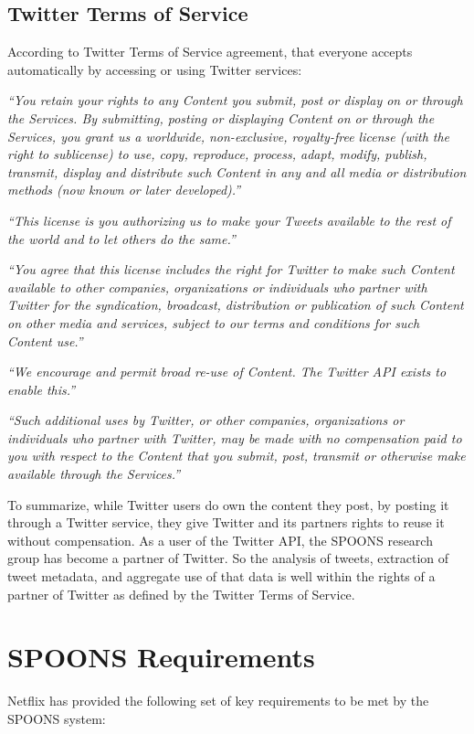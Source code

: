 \documentclass[12pt]{ucthesis}
\begin{document}
\subsection{Twitter Terms of Service}

According to Twitter Terms of Service\cite{termsOfService} agreement, that
everyone accepts automatically by accessing or using Twitter services:

\emph{``You retain your rights to any Content you submit, post or
display on or through the Services. By submitting, posting or displaying Content
on or through the Services, you grant us a worldwide, non-exclusive,
royalty-free license (with the right to sublicense) to use, copy, reproduce,
process, adapt, modify, publish, transmit, display and distribute such Content
in any and all media or distribution methods (now known or later developed).''}

\emph{``This license is you authorizing us to make your Tweets available to the
rest of the world and to let others do the same.''}

\emph{``You agree that this license includes the right for Twitter to make such
Content available to other companies, organizations or individuals who partner with
Twitter for the syndication, broadcast, distribution or publication of such
Content on other media and services, subject to our terms and conditions for
such Content use.''}

\emph{``We encourage and permit broad re-use of Content. The Twitter API exists to
enable this.''}

\emph{``Such additional uses by Twitter, or other companies, organizations or
individuals who partner with Twitter, may be made with no compensation paid to
you with respect to the Content that you submit, post, transmit or otherwise
make available through the Services.''}

To summarize, while Twitter users do own the content they post,
by posting it through a Twitter service, they give Twitter and its partners
rights to reuse it without compensation. As a user of the Twitter API, the
SPOONS research group has become a partner of Twitter. So the analysis of
tweets, extraction of tweet metadata, and aggregate use of that data is well
within the rights of a partner of Twitter as defined by the Twitter Terms of
Service.

\section{SPOONS Requirements}
Netflix has provided the following set of key requirements to be met by the
SPOONS system:
\end{document}
